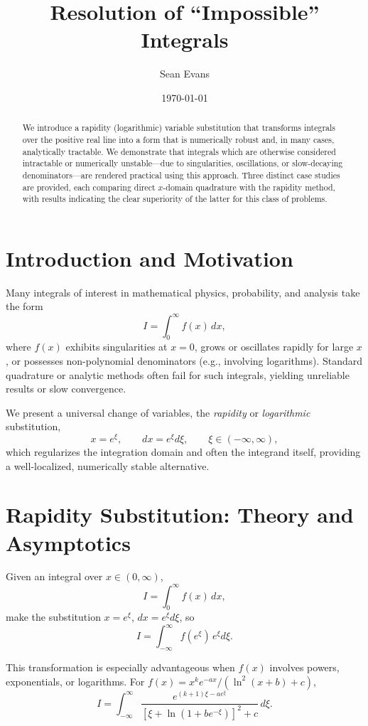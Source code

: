 \documentclass[12pt]{article}
\begin{document}
\title{Resolution of ``Impossible'' Integrals}
\author{Sean Evans}
\date{\today}
\maketitle

\begin{abstract}
We introduce a rapidity (logarithmic) variable substitution that transforms integrals over the positive real line into a form that is numerically robust and, in many cases, analytically tractable. We demonstrate that integrals which are otherwise considered intractable or numerically unstable---due to singularities, oscillations, or slow-decaying denominators---are rendered practical using this approach. Three distinct case studies are provided, each comparing direct $x$-domain quadrature with the rapidity method, with results indicating the clear superiority of the latter for this class of problems.
\end{abstract}

\section{Introduction and Motivation}

Many integrals of interest in mathematical physics, probability, and analysis take the form
\[
I = \int_0^\infty f(x)\, dx,
\]
where $f(x)$ exhibits singularities at $x=0$, grows or oscillates rapidly for large $x$, or possesses non-polynomial denominators (e.g., involving logarithms). Standard quadrature or analytic methods often fail for such integrals, yielding unreliable results or slow convergence.

We present a universal change of variables, the \emph{rapidity} or \emph{logarithmic} substitution,
\[
x = e^{\xi}, \qquad dx = e^{\xi} d\xi, \qquad \xi \in (-\infty, \infty),
\]
which regularizes the integration domain and often the integrand itself, providing a well-localized, numerically stable alternative.

\section{Rapidity Substitution: Theory and Asymptotics}

Given an integral over $x \in (0, \infty)$,
\[
I = \int_0^\infty f(x)\,dx,
\]
make the substitution $x = e^{\xi}$, $dx = e^{\xi} d\xi$, so
\[
I = \int_{-\infty}^{\infty} f(e^{\xi})\, e^{\xi} d\xi.
\]

This transformation is especially advantageous when $f(x)$ involves powers, exponentials, or logarithms. For $f(x) = x^k e^{-a x} / (\ln^2(x+b)+c)$,
\[
I = \int_{-\infty}^{\infty} \frac{e^{(k+1)\xi - a e^{\xi}}}{[\xi + \ln(1 + b e^{-\xi})]^2 + c}\, d\xi.
\]
\end{document}
